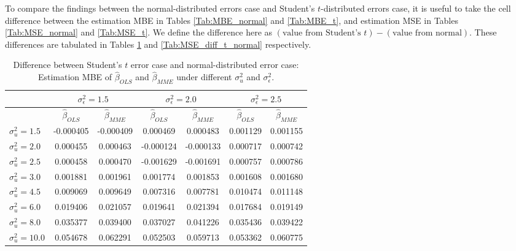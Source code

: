 \documentclass{article}
\begin{document}

To compare the findings between the normal-distributed errors case and Student's $t$-distributed errors case,
it is useful to take the cell difference between the estimation MBE in Tables \ref{Tab:MBE_normal} and \ref{Tab:MBE_t},
and estimation MSE in Tables \ref{Tab:MSE_normal} and \ref{Tab:MSE_t}.
We define the difference here as $(\textrm{value from Student's } t) - (\textrm{value from normal})$. 
These differences are tabulated in Tables \ref{Tab:MBE_diff_t_normal} and \ref{Tab:MSE_diff_t_normal} respectively.

\begin{table}[ht]
    \centering
    \caption{Difference between Student's $t$ error case and normal-distributed error case: Estimation MBE of $\hat{\beta}_{OLS}$ and $\hat{\beta}_{MME}$ under different $\sigma^2_u$ and $\sigma^2_\epsilon$.}
    \label{Tab:MBE_diff_t_normal}
    \begin{tabular}[t]{lcccccc}
        \hline
        &\multicolumn{2}{c}{$\sigma^2_\epsilon=1.5$}&\multicolumn{2}{c}{$\sigma^2_\epsilon=2.0$}&\multicolumn{2}{c}{$\sigma^2_\epsilon=2.5$}\\
        \hline
        &$\hat{\beta}_{OLS}$&$\hat{\beta}_{MME}$&$\hat{\beta}_{OLS}$&$\hat{\beta}_{MME}$&$\hat{\beta}_{OLS}$&$\hat{\beta}_{MME}$\\
        \hline
        $\sigma^2_u = 1.5$&-0.000405&-0.000409&0.000469&0.000483&0.001129&0.001155\\
        $\sigma^2_u = 2.0$&0.000455&0.000463&-0.000124&-0.000133&0.000717&0.000742\\
        $\sigma^2_u = 2.5$&0.000458&0.000470&-0.001629&-0.001691&0.000757&0.000786\\
        $\sigma^2_u = 3.0$&0.001881&0.001961&0.001774&0.001853&0.001608&0.001680\\
        $\sigma^2_u = 4.5$&0.009069&0.009649&0.007316&0.007781&0.010474&0.011148\\
        $\sigma^2_u = 6.0$&0.019406&0.021057&0.019641&0.021394&0.017684&0.019149\\
        $\sigma^2_u = 8.0$&0.035377&0.039400&0.037027&0.041226&0.035436&0.039422\\
        $\sigma^2_u = 10.0$&0.054678&0.062291&0.052503&0.059713&0.053362&0.060775\\
        \hline
    \end{tabular}
\end{table}
\end{document}
